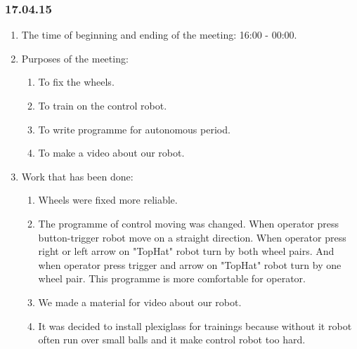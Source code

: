 \subsubsection{17.04.15}
\begin{enumerate}
	
	\item The time of beginning and ending of the meeting: 16:00 - 00:00.
	
	\item Purposes of the meeting: 
	\begin{enumerate}
		
		\item To fix the wheels.
		
		\item To train on the control robot.
		
		\item To write programme for autonomous period.
		
        \item To make a video about our robot.
		
	\end{enumerate}

	\item Work that has been done:
	\begin{enumerate}
		
		\item Wheels were fixed more reliable.
		
		\item The programme of control moving was changed. When operator press button-trigger robot move on a straight direction. When operator press right or left arrow on "TopHat" robot turn by both wheel pairs. And when operator press trigger and arrow on "TopHat" robot turn by one wheel pair. This programme is more comfortable for operator.
		
        \item We made a material for video about our robot.
        
        \item It was decided to install plexiglass for trainings because without it robot often run over small balls and it make control robot too hard.
        

\end{enumerate}
\end{enumerate}
